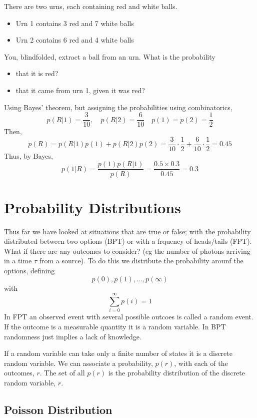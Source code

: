 \documentclass{dwnotes}         		        %
\begin{document}
\begin{example}
  There are two urns, each containing red and white balls.
  \begin{itemize}
  \item Urn 1 contains 3 red and 7 white balls
  \item Urn 2 contains 6 red and 4 white balls
  \end{itemize}
  You, blindfolded, extract a ball from an urn. What is the probability
  \begin{itemize}
  \item that it is red?
  \item that it came from urn 1, given it was red?
  \end{itemize}

  Using Bayes' theorem, but assigning the probabilities using
  combinatorics,
  \[ p(R|1) = \frac{3}{10}, \quad p(R|2) = \frac{6}{10} \quad p(1) =
  p(2) = \frac{1}{2} \]
  Then,
  \[ p(R) = p(R|1)p(1) + p(R|2)p(2) = \frac{3}{10} \cdot \frac{1}{2} +
  \frac{6}{10} \cdot \frac{1}{2} = 0.45 \] Thus, by Bayes,
  \[ p(1|R) = \frac{p(1)p(R|1)}{p(R)} = \frac{0.5 \times 0.3}{0.45} =
  0.3 \]
\end{example}

\section{Probability Distributions}
\label{sec:distributions}

Thus far we have looked at situations that are true or false; with the
probability distributed between two options (BPT) or with a frquency
of heads/tails (FPT). What if there are any outcomes to consider? (eg
the number of photons arriving in a time $\tau$ from a source). To do this we distribute the probability arounf the options, defining
\[ p(0), p(1), \dots, p(\infty) \] with \[ \sum_{i=0}^{\infty} p(i) =
1 \] In FPT an observed event with several possible outcoes is called
a random event. If the outcome is a measurable quantity it is a random
variable. In BPT randomness just implies a lack of knowledge.

If a random variable can take only a finite number of states it is a discrete random variable. We can associate a probability, $p(r)$, with each of the outcomes, $r$. The set of all $p(r)$ is the probability distribution of the discrete random variable, $r$.

\subsection{Poisson Distribution}
\label{sec:poisson}
\end{document}
